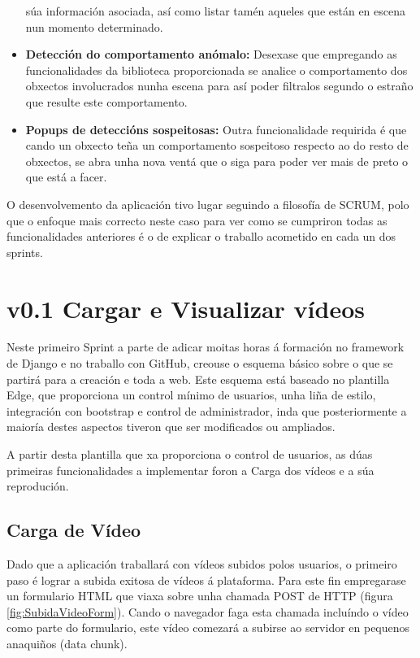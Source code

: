 \begin{itemize}
        súa información asociada, así como listar tamén aqueles que están en escena nun momento 
        determinado.
     \item \textbf{Detección do comportamento anómalo:} Desexase que empregando as funcionalidades
        da biblioteca proporcionada se analice o comportamento dos obxectos involucrados nunha 
        escena para así poder filtralos segundo o estraño que resulte este comportamento.
     \item \textbf{Popups de deteccións sospeitosas:} Outra funcionalidade requirida é que cando un
        obxecto teña un comportamento sospeitoso respecto ao do resto de obxectos, se abra unha nova
        ventá que o siga para poder ver mais de preto o que está a facer.
    \end{itemize}

O desenvolvemento da aplicación tivo lugar seguindo a filosofía de SCRUM, polo que o enfoque mais 
correcto neste caso para ver como se cumpriron todas as funcionalidades anteriores é o de explicar 
o traballo acometido en cada un dos sprints.
  
\section{v0.1 Cargar e Visualizar vídeos}
    Neste primeiro Sprint a parte de adicar moitas horas á formación no framework de Django e no 
    traballo con GitHub, creouse o esquema básico sobre o que se partirá para a creación e toda a
    web. Este esquema está baseado no plantilla Edge\cite{edge-templ}, que proporciona un control 
    mínimo de usuarios, unha liña de estilo, integración con bootstrap e control de administrador,
    inda que posteriormente a maioría destes aspectos tiveron que ser modificados ou ampliados.
    
    A partir desta plantilla que xa proporciona o control de usuarios, as dúas primeiras 
    funcionalidades a implementar foron a Carga dos vídeos e a súa reprodución.
    
    \subsection{Carga de Vídeo}
        Dado que a aplicación traballará con vídeos subidos polos usuarios, o primeiro paso é lograr
        a subida exitosa de vídeos á plataforma. Para este fin empregarase un formulario HTML que 
        viaxa sobre unha chamada POST de HTTP (figura \ref{fig:SubidaVideoForm}). 
        Cando o navegador faga esta chamada incluíndo o vídeo como parte do formulario, este vídeo
        comezará a subirse ao servidor en pequenos anaquiños (data chunk).
        

